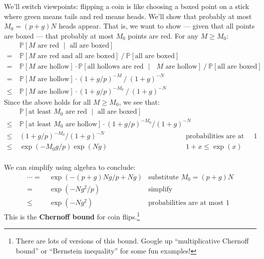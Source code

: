 \documentclass[openany, notitlepage, justified]{tufte-book}
\newcommand{\PP}{\mathbb{P}}
\begin{document}
            We'll switch viewpoints: flipping a coin is like choosing a boxed
            point on a stick where green means tails and red means heads.
            We'll show that probably at most $M_0 = (p+g)N$ heads
            appear.  That is, we want to show --- given that all points are
            boxed --- that probably at most $M_0$ points are red. 
            For any $M\geq M_0$:
            \begin{align*}
                    & ~ \PP[\text{$M$ are red $\mid$ all are boxed}] \\
                  = & ~ \PP[\text{$M$ are red and all are boxed}] ~/~ 
                        \PP[\text{all are boxed}]  \\
                  = & ~ \PP[\text{$M$ are hollow}] \cdot
                        \PP[\text{all hollows are red $\mid$ $M$ are hollow}] ~/~
                        \PP[\text{all are boxed}] \\
                  = & ~ \PP[\text{$M$ are hollow}] \cdot (1+g/p)^{-M} ~/~ (1+g)^{-N}  \\
                \leq& ~ \PP[\text{$M$ are hollow}] \cdot (1+g/p)^{-M_0} ~/~ (1+g)^{-N} 
            \end{align*}
            Since the above holds for all $M\geq M_0$, we see that:
            \begin{align*}
                ~& ~ \PP[\text{at least $M_0$ are red $\mid$ all are boxed}] \\
                \leq& ~ \PP[\text{at least $M_0$ are hollow}] \cdot (1+g/p)^{-M_0} / (1+g)^{-N} \\ 
                \leq& ~ (1+g/p)^{-M_0} / (1+g)^{-N}             & \text{probabilities are at most $1$} \\
                \leq& ~ \exp(-M_0 g/p) \exp(Ng)                 & \text{$1+x\leq \exp(x)$} \\ 
            \end{align*}

            We can simplify using algebra to conclude:
            \begin{align*}
                \cdots
                =   & ~ \exp(-(p+g)N g/p + Ng)                  & \text{substitute $M_0=(p+g)N$} \\ 
                =   & ~                          \exp(-Ng^2/p)  & \text{simplify}                \\ 
                \leq& ~ \exp(-Ng^2)                             & \text{probabilities are at most $1$}
            \end{align*}
            This is the \textbf{Chernoff bound} for coin flips.\footnote{
                There are lots of versions of this bound.  Google up 
                ``multiplicative Chernoff bound'' or ``Bernstein inequality''
                for some fun examples!
            }
\end{document}
